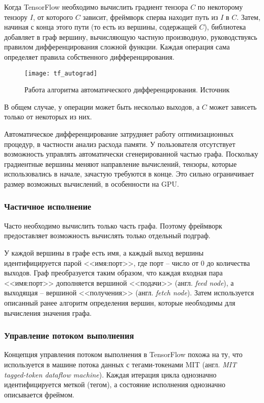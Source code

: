 Когда TensorFlow необходимо вычислить градиент тензора $C$ по некоторому
тензору $I$, от которого $C$ зависит, фреймворк сперва находит путь из
$I$ в $C$. Затем, начиная с конца этого пути (то есть из вершины, содержащей $C$),
библиотека добавляет в граф вершину, вычисляющую частную производную,
руководствуясь правилом дифференцирования сложной функции. Каждая операция сама
определяет правила собственного дифференцирования.

\begin{figure}[h]
    \centering
    \texttt{[image: tf\_autograd]}
    \caption{Работа алгоритма автоматического дифференцирования. Источник \cite{Abadi2016}}
    \label{fig:tf_autograd}
\end{figure}

В общем случае, у операции может быть несколько выходов, а $C$ может зависеть
только от некоторых из них.

Автоматическое дифференцирование затрудняет работу оптимизационных процедур,
в частности анализ расхода памяти. У пользователя отсутствует возможность
управлять автоматически сгенерированной частью графа. Поскольку градиентные
вершины меняют направление вычислений, тензоры, которые использовались в начале,
зачастую требуются в конце. Это сильно ограничивает размер возможных вычислений,
в особенности на GPU.

\subsubsection{Частичное исполнение}

Часто необходимо вычислить только часть графа. Поэтому фреймворк предоставляет
возможность вычислять только отдельный подграф.

У каждой вершины в графе есть имя, а каждый выход вершины идентифицируется парой
<<имя:порт>>, где порт -- число от 0 до количества выходов. Граф преобразуется
таким образом, что каждая входная пара <<имя:порт>> дополняется вершиной
<<подачи>> (англ. \textit{feed node}), а выходящая -- вершиной <<получения>>
(англ. \textit{fetch node}). Затем используется описанный ранее алгоритм
определения вершин, которые необходимы для вычисления значения графа.

\subsubsection{Управление потоком выполнения}

Концепция управления потоком выполнения в TensorFlow похожа на ту, что
используется в машине потока данных с тегами-токенами MIT (англ.
\textit{MIT tagged-token dataflow machine})\cite{Arvind1987}.
Каждая итерация цикла однозначно идентифицируется меткой (тегом), а состояние
исполнения однозначно описывается фреймом.

